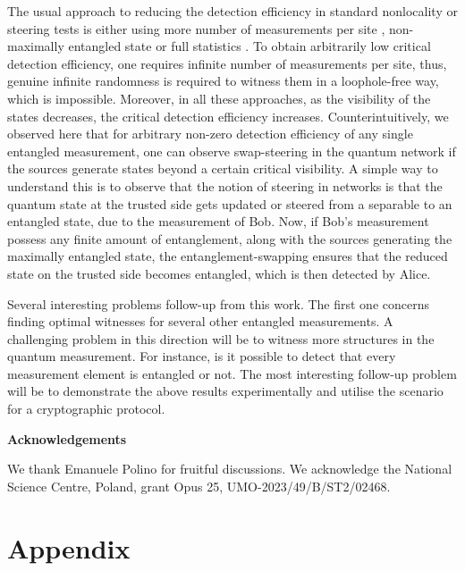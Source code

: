 \documentclass[pra,twocolumn,showpacs]{revtex4-2}
\theoremstyle{plain}
\theoremstyle{definition}
\theoremstyle{remark}
\begin{document}
The usual approach to reducing the detection efficiency in standard nonlocality or steering tests is either using more number of measurements per site \cite{Miklin_2022,Srivastav_2022, Vallone_2013}, non-maximally entangled state \cite{CH} or full statistics \cite{Masini}. To obtain arbitrarily low critical detection efficiency, one requires infinite number of measurements per site, thus, genuine infinite randomness is required to witness them in a loophole-free way, which is impossible. Moreover, in all these approaches, as the visibility of the states decreases, the critical detection efficiency increases. Counterintuitively, we observed here that for arbitrary non-zero detection efficiency of any single entangled measurement, one can observe swap-steering in the quantum network if the sources generate states beyond a certain critical visibility. A simple way to understand this is to observe that the notion of steering in networks is that the quantum state at the trusted side gets updated or steered from a separable to an entangled state, due to the measurement of Bob. Now, if Bob's measurement possess any finite amount of entanglement, along with the sources generating the maximally entangled state, the entanglement-swapping ensures that the reduced state on the trusted side becomes entangled, which is then detected by Alice. 


Several interesting problems follow-up from this work. The first one concerns finding optimal witnesses for several other entangled measurements. A challenging problem in this direction will be to witness more structures in the quantum measurement. For instance, is it possible to detect that every measurement element is entangled or not. The most interesting follow-up problem will be to demonstrate the above results experimentally and utilise the scenario for a cryptographic protocol.%

\begin{center}
    \textbf{Acknowledgements}
\end{center}
We thank Emanuele Polino for fruitful discussions. We acknowledge the National Science Centre, Poland, grant Opus 25, UMO-2023/49/B/ST2/02468.


%


\onecolumngrid
\section*{Appendix}
\end{document}
